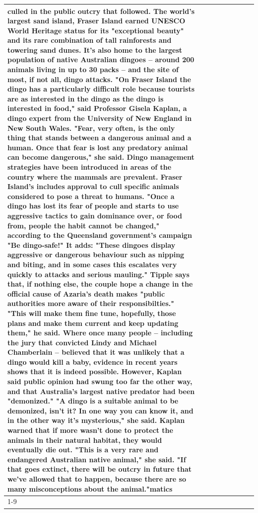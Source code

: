 \begin{table}[H]
\begin{tabular}{lllrlllll}
culled in the public outcry that followed. The world's largest sand island, Fraser Island earned UNESCO World Heritage status for its "exceptional beauty" and its rare combination of tall rainforests and towering sand dunes. It's also home to the largest population of native Australian dingoes -- around 200 animals living in up to 30 packs -- and the site of most, if not all, dingo attacks. "On Fraser Island the dingo has a particularly difficult role because tourists are as interested in the dingo as the dingo is interested in food," said Professor Gisela Kaplan, a dingo expert from the University of New England in New South Wales. "Fear, very often, is the only thing that stands between a dangerous animal and a human. Once that fear is lost any predatory animal can become dangerous," she said. Dingo management strategies have been introduced in areas of the country where the mammals are prevalent. Fraser Island's includes approval to cull specific animals considered to pose a threat to humans. "Once a dingo has lost its fear of people and starts to use aggressive tactics to gain dominance over, or food from, people the habit cannot be changed," according to the Queensland government's campaign "Be dingo-safe!" It adds: "These dingoes display aggressive or dangerous behaviour such as nipping and biting, and in some cases this escalates very quickly to attacks and serious mauling." Tipple says that, if nothing else, the couple hope a change in the official cause of Azaria's death makes "public authorities more aware of their responsibilties." "This will make them fine tune, hopefully, those plans and make them current and keep updating them," he said. Where once many people -- including the jury that convicted Lindy and Michael Chamberlain -- believed that it was unlikely that a dingo would kill a baby, evidence in recent years shows that it is indeed possible. However, Kaplan said public opinion had swung too far the other way, and that Australia's largest native predator had been "demonized." "A dingo is a suitable animal to be demonized, isn't it? In one way you can know it, and in the other way it's mysterious," she said. Kaplan warned that if more wasn't done to protect the animals in their natural habitat, they would eventually die out. "This is a very rare and endangered Australian native animal," she said. "If that goes extinct, there will be outcry in future that we've allowed that to happen, because there are so many misconceptions about the animal."matics \\
\cline{1-9}

\end{tabular}
\end{table}
